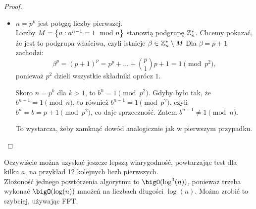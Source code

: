 \begin{proof}
\begin{itemize}
        \item \( n = p^k \) jest potęgą liczby pierwszej. \\
        Liczby \( M = \set{a : a^{n-1} = 1 \mod n} \) stanowią podgrupę \( \mathbb{Z}_n^* \). Chcemy pokazać, że jest to podgrupa właściwa, czyli istnieje \( \beta \in \mathbb{Z}_n^* \setminus M \)
        Dla \( \beta = p + 1 \) zachodzi:
        \[
            \beta^p = (p + 1)^p = p^p + \ldots + \binom{p}{1} p + 1 = 1 \pmod{p^2},
        \]
        ponieważ \( p^2 \) dzieli wszystkie składniki oprócz \( 1 \).
        
        Skoro \( n = p^k \) dla \( k > 1 \), to \( b^n = 1 \pmod{p^2} \).
        Gdyby było tak, że \( b^{n-1} = 1 \pmod{n} \), to również \( b^{n-1} = 1 \pmod{p^2} \), czyli \( b^n = b = p + 1 \pmod{p^2} \), co daje sprzeczność. Zatem \( b^{n-1} \neq 1 \pmod{n} \).
        
        To wystarcza, żeby zamknąć dowód analogicznie jak w pierwszym przypadku.
    \end{itemize}
\end{proof}
Oczywiście można uzyskać jeszcze lepszą wiarygodność, powtarzając test dla kilku \( a \), na przykład 12 kolejnych liczb pierwszych. \\
Złożoność jednego powtórzenia algorytmu to \( \bigO(\log^3(n)) \), ponieważ trzeba wykonać \( \bigO(\log(n)) \) mnożeń na liczbach długości \( \log(n) \). Można zrobić to szybciej, używając FFT.
